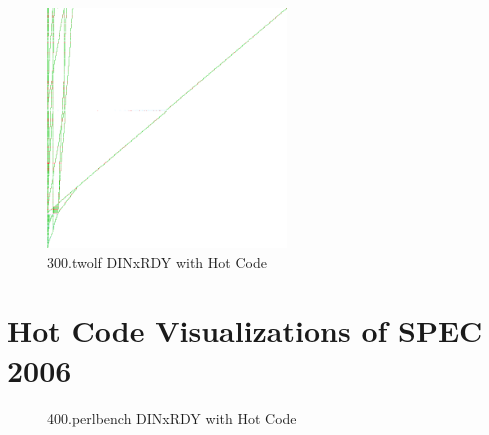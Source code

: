 \documentclass[defaultstyle,11pt]{thesis}
\begin{document}
\begin{figure}
  \centering
  \includegraphics[height=2.50in]{images/hotcode/300twolfRunRef1_1000mil}
  \caption{300.twolf DINxRDY with Hot Code}
  \label{fig:300twolfhot}
\end{figure}

\chapter{Hot Code Visualizations of SPEC 2006} 
\label{appdx:hotcode2006}

\begin{figure}
  \centering
  \hspace{5mm}
  \caption{400.perlbench DINxRDY with Hot Code}
  \label{fig:400perlhot}
\end{figure}
\end{document}
